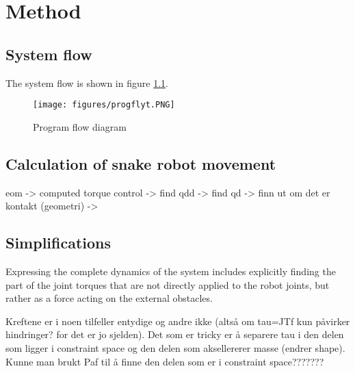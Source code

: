 \chapter{Method}\label{ch:method}


\section{System flow}

The system flow is shown in figure \ref{fig:prog_flow}.

\begin{figure}[h!]
    \centering
    \texttt{[image: figures/progflyt.PNG]}
    \caption{Program flow diagram}
    \label{fig:prog_flow}
\end{figure}


\section{Calculation of snake robot movement}

eom -> computed torque control -> find qdd -> find qd -> finn ut om det er kontakt (geometri) ->  




\section{Simplifications}

Expressing the complete dynamics of the system includes explicitly finding the part of the joint torques that are not directly applied to the robot joints, but rather as a force acting on the external obstacles.

Kreftene er i noen tilfeller entydige og andre ikke (altså om tau=JTf kun påvirker hindringer? for det er jo sjelden). Det som er tricky er å separere tau i den delen som ligger i constraint space og den delen som aksellererer masse (endrer shape). Kunne man brukt Paf til å finne den delen som er i constraint space??????? 

